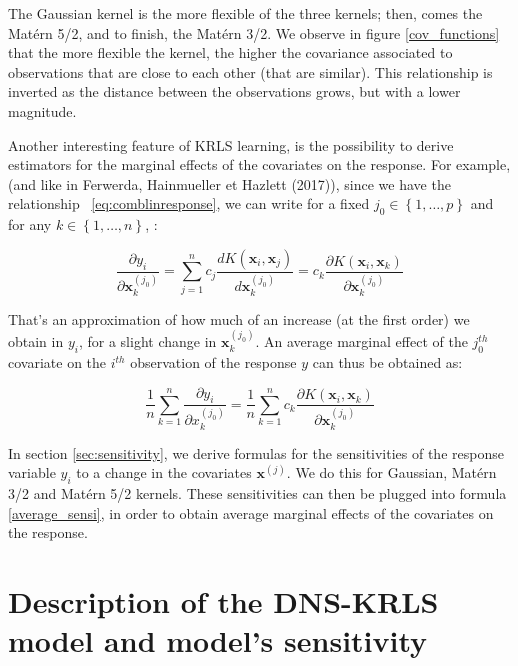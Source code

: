 The Gaussian kernel is the more flexible of the three kernels; then, comes the Mat\'ern 5/2, and to finish, the Mat\'ern 3/2. We observe in figure \ref{cov_functions} that the more flexible the kernel, the higher the covariance associated to observations that are close to each other (that are similar). This relationship is inverted as the distance between the observations grows, but with a lower magnitude. 

Another interesting feature of KRLS learning, is the possibility to derive estimators for the  marginal effects of the covariates on the response. For example, (and like in Ferwerda, Hainmueller et Hazlett (2017)), since we have the relationship ~\ref{eq:comblinresponse}, we can write for a fixed $j_0 \in \left \lbrace 1, \ldots, p \right \rbrace$ and for any $k \in \left \lbrace 1, \ldots, n \right \rbrace $, :

\begin{equation}
\frac{\partial y_i}{\partial \textbf{x}_k^{(j_0)}} = \sum_{j = 1}^n c_j \frac{d K(\textbf{x}_i, \textbf{x}_j)}{d \textbf{x}_k^{(j_0)}} = c_k \frac{\partial K(\textbf{x}_i, \textbf{x}_k)}{\partial \textbf{x}_k^{(j_0)}}
\end{equation}

\medskip

That's an approximation of how much of an increase (at the first order) we obtain in $y_i$,  for a slight change in $\textbf{x}_k^{(j_0)}$. An average marginal effect of the $j_0^{th}$ covariate on the $i^{th}$ observation of the response $y$ can thus be obtained as:

\begin{equation}
\label{average_sensi}
\frac{1}{n}\sum_{k = 1}^n \frac{\partial y_i}{\partial x_k^{(j_0)}} = \frac{1}{n}\sum_{k = 1}^n c_k \frac{\partial K(\textbf{x}_i, \textbf{x}_k)}{\partial \textbf{x}_k^{(j_0)}}
\end{equation}

In section \ref{sec:sensitivity}, we derive formulas for the sensitivities of the response variable $y_i$ to a change in the covariates $\textbf{x}^{(j)}$. We do this for Gaussian, Mat\'ern 3/2 and Mat\'ern 5/2 kernels. These sensitivities can then be plugged into formula \ref{average_sensi}, in order to obtain average marginal effects of the covariates on the response.

\section{Description of the DNS-KRLS model and model's sensitivity}
\label{sec:dnskrls}

